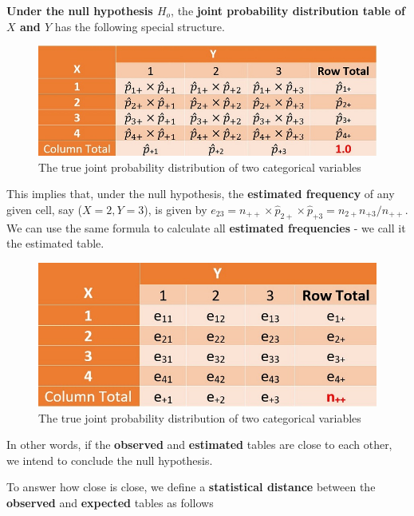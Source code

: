 \documentclass[
]{book}
\begin{document}
\textbf{Under the null hypothesis \(H_o\)}, the \textbf{joint probability distribution table of \(X\) and \(Y\)} has the following special structure.

\begin{figure}

{\centering \includegraphics[width=0.8\linewidth]{img12/w12-NULLProbTable} 

}

\caption{The true joint probability distribution of two categorical variables}\label{fig:unnamed-chunk-192}
\end{figure}

This implies that, under the null hypothesis, the \textbf{estimated frequency} of any given cell, say (\(X=2,Y=3\)), is given by \(e_{23} = n_{++} \times \hat{p}_{2+}\times\hat{p}_{+3} = n_{2+}n_{+3}/n_{++}\). We can use the same formula to calculate all \textbf{estimated frequencies} - we call it the estimated table.

\begin{figure}

{\centering \includegraphics[width=0.8\linewidth]{img12/w12-ExpectedTable} 

}

\caption{The true joint probability distribution of two categorical variables}\label{fig:unnamed-chunk-193}
\end{figure}

In other words, if the \textbf{observed} and \textbf{estimated} tables are close to each other, we intend to conclude the null hypothesis.

To answer how close is close, we define a \textbf{statistical distance} between the \textbf{observed} and \textbf{expected} tables as follows
\end{document}
